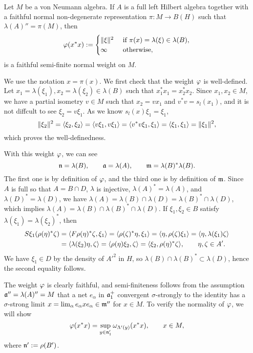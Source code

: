 \documentclass{../../../small}
\begin{document}
\begin{thm}
Let $M$ be a von Neumann algebra.
If $A$ is a full left Hilbert algebra together with a faithful normal non-degenerate representation $\pi:M\to B(H)$ such that $\lambda(A)''=\pi(M)$, then
\[\varphi(x^*x):=\begin{cases}\|\xi\|^2&\text{ if }\pi(x)=\lambda(\xi)\in\lambda(B),\\\infty&\text{ otherwise},\end{cases}\]
is a faithful semi-finite normal weight on $M$.
\end{thm}
\begin{pf}
We use the notation $x=\pi(x)$.
We first check that the weight $\varphi$ is well-defined.
Let $x_1=\lambda(\xi_1),x_2=\lambda(\xi_2)\in\lambda(B)$ such that $x_1^*x_1=x_2^*x_2$.
Since $x_1,x_2\in M$, we have a partial isometry $v\in M$ such that $x_2=vx_1$ and $v^*v=s_l(x_1)$, and it is not diffcult to see $\xi_2=v\xi_1$.
As we know $s_l(x)\xi_1=\xi_1$,
\[\|\xi_2\|^2=\langle\xi_2,\xi_2\rangle=\langle v\xi_1,v\xi_1\rangle=\langle v^*v\xi_1,\xi_1\rangle=\langle\xi_1,\xi_1\rangle=\|\xi_1\|^2,\]
which proves the well-definedness.

With this weight $\varphi$, we can see
\[\mathfrak{n}=\lambda(B),\qquad\mathfrak{a}=\lambda(A),\qquad\mathfrak{m}=\lambda(B)^*\lambda(B).\]
The first one is by definition of $\varphi$, and the third one is by definition of $\mathfrak{m}$.
Since $A$ is full so that $A=B\cap D$, $\lambda$ is injective, $\lambda(A)^*=\lambda(A)$, and $\lambda(D)^*=\lambda(D)$, we have $\lambda(A)=\lambda(B)\cap\lambda(D)=\lambda(B)^*\cap\lambda(D)$, which implies $\lambda(A)=\lambda(B)\cap\lambda(B)^*\cap\lambda(D)$.
If $\xi_1,\xi_2\in B$ satisfy $\lambda(\xi_1)=\lambda(\xi_2)^*$, then
\begin{align*}
S\xi_1(\rho(\eta)^*\zeta)
&=\langle F\rho(\eta)^*\zeta,\xi_1\rangle
=\langle\rho(\zeta)^*\eta,\xi_1\rangle
=\langle\eta,\rho(\zeta)\xi_1\rangle
=\langle\eta,\lambda(\xi_1)\zeta\rangle\\
&=\langle\lambda(\xi_2)\eta,\zeta\rangle
=\langle\rho(\eta)\xi_2,\zeta\rangle
=\langle\xi_2,\rho(\eta)^*\zeta\rangle,
\qquad\eta,\zeta\in A'.
\end{align*}
We have $\xi_1\in D$ by the density of $A'^2$ in $H$, so $\lambda(B)\cap\lambda(B)^*\subset\lambda(D)$, hence the second equality follows.

The weight $\varphi$ is clearly faithful, and semi-finiteness follows from the assumption $\mathfrak{a}''=\lambda(A)''=M$ that a net $e_\alpha$ in $\mathfrak{a}_1^+$ convergent $\sigma$-strongly to the identity has a $\sigma$-strong limit $x=\lim_\alpha e_\alpha xe_\alpha\in\mathfrak{m}''$ for $x\in M$.
To verify the normality of $\varphi$, we will show
\[\varphi(x^*x)=\sup_{y\in\mathfrak{n}'_1}\omega_{\Lambda'(y)}(x^*x),\qquad x\in M,\]
where $\mathfrak{n}':=\rho(B')$.


\end{pf}
\end{document}
